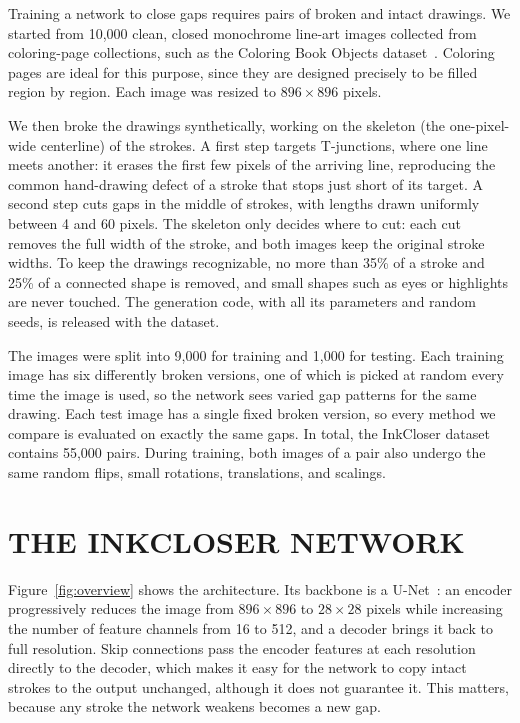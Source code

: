\documentclass{IEEEcsmag}
\begin{document}
Training a network to close gaps requires pairs of broken and intact drawings. We
started from 10,000 clean, closed monochrome line-art images collected from
coloring-page collections, such as the Coloring Book Objects
dataset~\cite{chen2019human}. Coloring pages are ideal for this purpose, since they
are designed precisely to be filled region by region. Each image was resized to
$896\times 896$ pixels.

We then broke the drawings synthetically, working on the skeleton (the one-pixel-wide
centerline) of the strokes. A first step targets T-junctions, where one line meets
another: it erases the first few pixels of the arriving line, reproducing the common
hand-drawing defect of a stroke that stops just short of its target. A second step
cuts gaps in the middle of strokes, with lengths drawn uniformly between 4 and 60
pixels. The skeleton only decides where to cut: each cut removes the full width of the
stroke, and both images keep the original stroke widths. To keep the drawings
recognizable, no more than
35\% of a stroke and 25\% of a connected shape is removed, and small shapes such as
eyes or highlights are never touched. The generation code, with all its parameters
and random seeds, is released with the dataset.

The images were split into 9,000 for training and 1,000 for testing. Each training
image has six differently broken versions, one of which is picked at random every
time the image is used, so the network sees varied gap patterns for the same drawing.
Each test image has a single fixed broken version, so every method we compare is
evaluated on exactly the same gaps. In total, the InkCloser dataset contains 55,000
pairs. During training, both images of a pair also undergo the same random flips,
small rotations, translations, and scalings.

\section{THE INKCLOSER NETWORK}

Figure~\ref{fig:overview} shows the architecture. Its backbone is a U-Net~\cite{ronneberger2015unet}:
an encoder progressively reduces the image from $896\times 896$ to $28\times 28$
pixels while increasing the number of feature channels from 16 to 512, and a decoder
brings it back to full resolution. Skip connections pass the encoder features at each
resolution directly to the decoder, which makes it easy for the network to copy
intact strokes to the output unchanged, although it does not guarantee it. This matters, because any stroke the network
weakens becomes a new gap.
\end{document}
